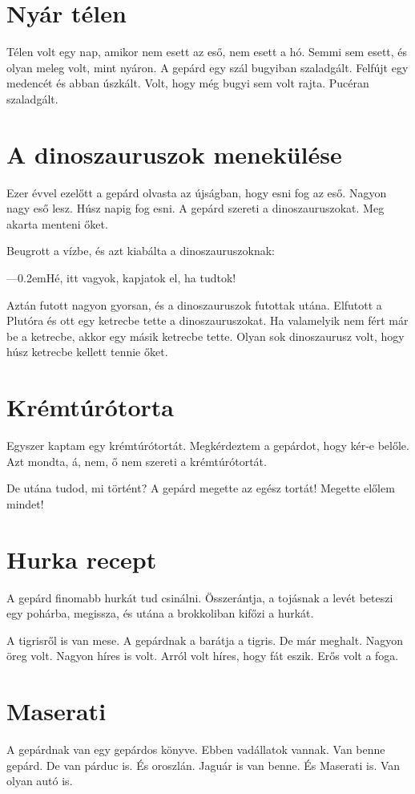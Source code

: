 \documentclass[12pt]{memoir}
\def\dash{---\kern 0.2em}
\begin{document}
\section{Nyár télen}
Télen volt egy nap, amikor nem esett az eső, nem esett a hó. Semmi sem esett,
és olyan meleg volt, mint nyáron. A gepárd egy szál bugyiban szaladgált.
Felfújt egy medencét és abban úszkált. Volt, hogy még bugyi sem volt rajta.
Pucéran szaladgált.
\cleartoverso


\section{A dinoszauruszok menekülése}
Ezer évvel ezelőtt a gepárd olvasta az újságban, hogy esni fog az eső. Nagyon
nagy eső lesz. Húsz napig fog esni. A gepárd szereti a dinoszauruszokat. Meg
akarta menteni őket.

Beugrott a vízbe, és azt kiabálta a dinoszauruszoknak:

\dash Hé, itt vagyok, kapjatok el, ha tudtok!

Aztán futott nagyon gyorsan, és a dinoszauruszok futottak utána.  Elfutott a
Plutóra és ott egy ketrecbe tette a dinoszauruszokat. Ha valamelyik nem fért
már be a ketrecbe, akkor egy másik ketrecbe tette. Olyan sok dinoszaurusz volt,
hogy húsz ketrecbe kellett tennie őket.
\cleartoverso


\section{Krémtúrótorta}
Egyszer kaptam egy krémtúrótortát. Megkérdeztem a gepárdot, hogy kér-e belőle.
Azt mondta, á, nem, ő nem szereti a krémtúrótortát.

De utána tudod, mi történt? A gepárd megette az egész tortát! Megette előlem
mindet!
\cleartoverso


\section{Hurka recept}
A gepárd finomabb hurkát tud csinálni. Összerántja, a tojásnak a levét beteszi
egy pohárba, megissza, és utána a brokkoliban kifőzi a hurkát.

A tigrisről is van mese. A gepárdnak a barátja a tigris. De már meghalt. Nagyon
öreg volt. Nagyon híres is volt. Arról volt híres, hogy fát eszik. Erős volt a
foga.
\cleartoverso


\section{Maserati}
A gepárdnak van egy gepárdos könyve. Ebben vadállatok vannak. Van benne gepárd.
De van párduc is. És oroszlán. Jaguár is van benne. És Maserati is. Van olyan
autó is.
\end{document}
